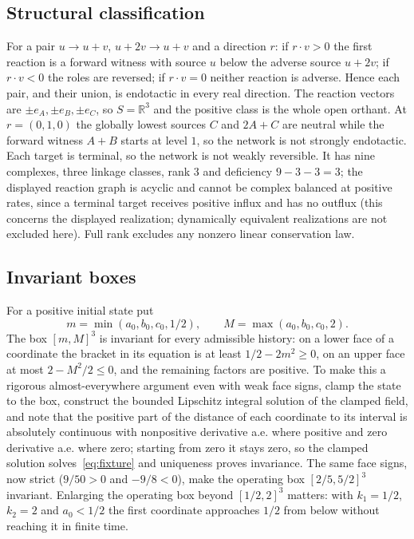 \documentclass[11pt]{article}
\theoremstyle{definition}
\theoremstyle{remark}
\newcommand{\R}{\mathbb R}
\begin{document}
\subsection{Structural classification}\label{sec:classification}
For a pair $u\to u+v$, $u+2v\to u+v$ and a direction $r$: if $r\cdot v>0$ the first
reaction is a forward witness with source $u$ below the adverse source $u+2v$; if
$r\cdot v<0$ the roles are reversed; if $r\cdot v=0$ neither reaction is adverse.
Hence each pair, and their union, is endotactic in every real direction. The
reaction vectors are $\pm e_A,\pm e_B,\pm e_C$, so $S=\R^3$ and the positive class
is the whole open orthant. At $r=(0,1,0)$ the globally lowest sources $C$ and
$2A+C$ are neutral while the forward witness $A+B$ starts at level $1$, so the
network is not strongly endotactic. Each target is terminal, so the network is not
weakly reversible. It has nine complexes, three linkage classes, rank $3$ and
deficiency $9-3-3=3$; the displayed reaction graph is acyclic and cannot be complex
balanced at positive rates, since a terminal target receives positive influx and
has no outflux (this concerns the displayed realization; dynamically equivalent
realizations are not excluded here). Full rank excludes any nonzero linear
conservation law.

\subsection{Invariant boxes}\label{sec:boxes}
For a positive initial state put
\begin{equation}\label{eq:startup}
 m=\min(a_0,b_0,c_0,1/2),\qquad M=\max(a_0,b_0,c_0,2).
\end{equation}
The box $[m,M]^3$ is invariant for every admissible history: on a lower face of a
coordinate the bracket in its equation is at least $1/2-2m^2\ge0$, on an upper face
at most $2-M^2/2\le0$, and the remaining factors are positive. To make this a
rigorous almost-everywhere argument even with weak face signs, clamp the state to
the box, construct the bounded Lipschitz integral solution of the clamped field,
and note that the positive part of the distance of each coordinate to its interval
is absolutely continuous with nonpositive derivative a.e. where positive and zero
derivative a.e. where zero; starting from zero it stays zero, so the clamped
solution solves~\eqref{eq:fixture} and uniqueness proves invariance. The same face
signs, now strict ($9/50>0$ and $-9/8<0$), make the operating box
$[2/5,5/2]^3$ invariant. Enlarging the operating box beyond $[1/2,2]^3$ matters:
with $k_1=1/2$, $k_2=2$ and $a_0<1/2$ the first coordinate approaches $1/2$ from
below without reaching it in finite time.
\end{document}
